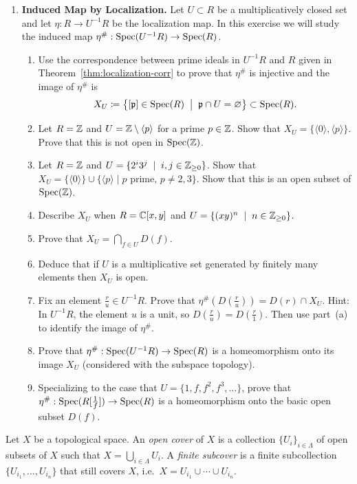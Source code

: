 \documentclass[12pt,reqno]{amsart}
\begin{document}
\begin{enumerate}[leftmargin=*, series=problems]
 \item \textbf{Induced Map by Localization.}  Let $U\subset R$ be a multiplicatively closed set and let $\eta:R\to U^{-1}R$ be the localization map. In this exercise we will study the induced map $\eta^{\#}:\operatorname{Spec}(U^{-1}R) \to \operatorname{Spec}(R)$. 
 \begin{enumerate}
 	\item Use the correspondence between prime ideals in $U^{-1}R$ and $R$ given in Theorem~\ref{thm:localization-corr} to prove that $\eta^{\#}$ is injective and the image of $\eta^{\#}$ is
	\[
	X_{U} \coloneqq \left\{[\mathfrak{p}] \in \operatorname{Spec}(R) \;\; \big| \;\; \mathfrak{p} \cap U = \varnothing\right\} \subset \operatorname{Spec}(R).
	\]
	\item Let $R=\mathbb{Z}$ and $U=\mathbb{Z}\setminus \langle p \rangle$ for a prime $p\in \mathbb{Z}$. Show that $X_U=\{\langle 0 \rangle, \langle p \rangle\}$.  Prove that this is not open in $\operatorname{Spec}(\mathbb{Z})$.
	\item Let $R=\mathbb{Z}$ and $U=\{2^{i}3^{j} \;\; | \;\;  i,j\in \mathbb{Z}_{\geq0}\}$. Show that $X_{U}=\{\langle 0\rangle\} \cup \{\langle p \rangle \; | \; \text{$p$ prime,  $p\neq2,3$}\}$. Show that this is an open subset of  $\operatorname{Spec}(\mathbb{Z})$.
	\item Describe $X_U$ when $R=\mathbb{C}[x,y]$ and $U=\{(xy)^n \;\; | \; \;  n\in\mathbb{Z}_{\geq0}\}$.
	\item Prove that $X_{U} = \bigcap_{f \in U} D(f)$. 
	\item Deduce that if $U$ is a multiplicative set generated by finitely many elements then $X_{U}$ is open. 
	\item Fix an element $\frac{r}{u} \in U^{-1}R$. Prove that $\eta^{\#}(D(\frac{r}{u})) = D(r) \cap X_{U}$. Hint: In $U^{-1}R$, the element $u$ is a unit, so $D(\frac{r}{u})=D(\frac{r}{1})$. Then use part~(a) to identify the image of $\eta^{\#}$.
	\item Prove that $\eta^{\#}:\operatorname{Spec}(U^{-1}R) \to \operatorname{Spec}(R)$ is a homeomorphism onto its image $X_{U}$ (considered with the subspace topology). 
	\item Specializing to the case that $U=\{1,f,f^2,f^3,\ldots\}$, prove that $\eta^{\#}:\operatorname{Spec}(R[\frac{1}{f}]) \to \operatorname{Spec}(R)$ is a homeomorphism onto the basic open subset $D(f)$.
\end{enumerate} 
\end{enumerate}

\hrulefill

Let $X$ be a topological space. An \emph{open cover} of $X$ is a collection $\{U_i\}_{i \in \Lambda}$ of open subsets of $X$ such that $X = \bigcup_{i \in \Lambda} U_i$. A \emph{finite subcover} is a finite subcollection $\{U_{i_1}, \dots, U_{i_n}\}$ that still covers $X$, i.e.\ $X = U_{i_1} \cup \cdots \cup U_{i_n}$.
 
\end{document}
